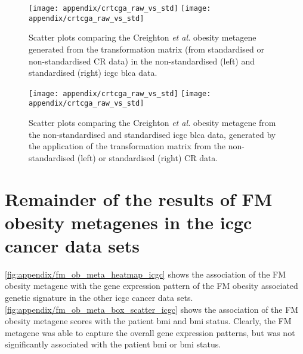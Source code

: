 \begin{appendices}
	\begin{figure}[h]
		\centering
		\texttt{[image: appendix/crtcga\_raw\_vs\_std]}
		\hfill
		\texttt{[image: appendix/crtcga\_raw\_vs\_std]}\\
		\caption[Comparison of the Creighton \textit{et al.} obesity metagene generated from the standardised or non-standardised TM]{Scatter plots comparing the Creighton \textit{et al.} obesity metagene generated from the transformation matrix (from standardised or non-standardised CR data) in the non-standardised (left) and standardised (right) \gls{icgc} \gls{blca} data.}
		\label{fig:appendix/check_raw_vs_std}
	\end{figure}

	\begin{figure}[h]
		\centering
		\texttt{[image: appendix/crtcga\_raw\_vs\_std]}
		\hfill
		\texttt{[image: appendix/crtcga\_raw\_vs\_std]}\\
		\caption[Comparison of the Creighton \textit{et al.} obesity metagene generated from the standardised or non-standardised  \gls{icgc} \gls{blca} data]{Scatter plots comparing the Creighton \textit{et al.} obesity metagene from the non-standardised  and standardised  \gls{icgc} \gls{blca} data, generated by the application of the transformation matrix from the non-standardised (left) or standardised (right) CR data.}
		\label{fig:appendix/check_raw_vs_std_tm}
	\end{figure}

	\section{Remainder of the results of FM obesity metagenes in the \gls{icgc} cancer data sets}
	\label{sec:rest_of_the_fm_icgc_cancer_heatmap_results}

	\cref{fig:appendix/fm_ob_meta_heatmap_icgc} shows the association of the FM obesity metagene with the gene expression pattern of the FM obesity associated genetic signature in the other \gls{icgc} cancer data sets.
	\cref{fig:appendix/fm_ob_meta_box_scatter_icgc} shows the association of the FM obesity metagene scores with the patient \gls{bmi} and \gls{bmi} status.
	Clearly, the FM metagene was able to capture the overall gene expression patterns, but was not significantly associated with the patient \gls{bmi} or \gls{bmi} status.


\end{appendices}

